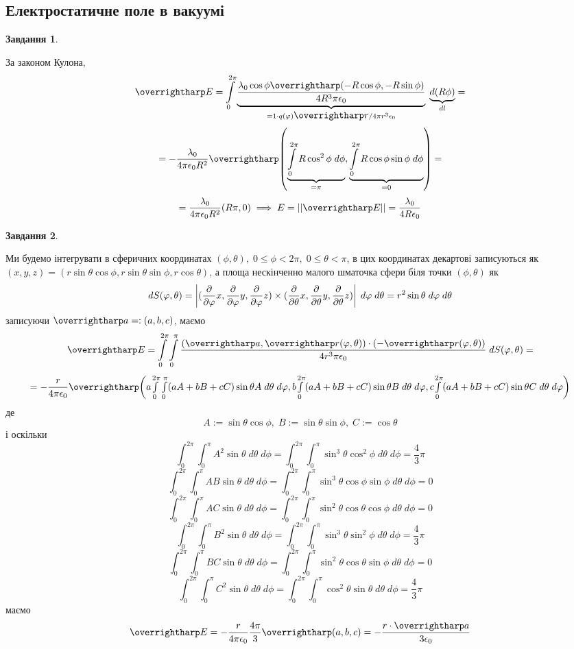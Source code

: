 \documentclass[12pt]{article} %
\newtheorem{prob}{Завдання}
\begin{document}
\subsection{Електростатичне поле в вакуумі}
\setcounter{prob}{0}
\begin{prob}\end{prob}%
	За законом Кулона,
	\[\myvec{E}=\int_0^{2\pi}\underbrace{\frac{\lambda_0\cos\oldphi\myvec{(-R\cos\oldphi,-R\sin\oldphi)}}{4R^3\pi\epsilon_0}}
	_{=1\cdot q(\phi)\myvec{r}/4\pi r^3\epsilon_0}\;\underbrace{d(R\oldphi)}_{dl}=\]
	\[=-\frac{\lambda_0}{4\pi\epsilon_0R^2}\myvec{\mybra{\underbrace{\int_0^{2\pi}R\cos^2\oldphi\;d\oldphi}_{=\pi},
	\underbrace{\int_0^{2\pi}R\cos\oldphi\sin\oldphi\;d\oldphi}_{=0}}}=\]
	\[=\frac{\lambda_0}{4\pi\epsilon_0R^2}(R\pi,0)\implies E=\mynorm{\myvec{E}}=\frac{\lambda_0}{4R\epsilon_0}\]
\begin{prob}\end{prob}%
	Ми будемо інтегрувати в сферичних координатах $(\phi,\theta),\;0\leq\phi<2\pi,\;0\leq\theta<\pi$, в цих координатах декартові записуються
	як $(x,y,z)=(r\sin\theta\cos\phi,r\sin\theta\sin\phi,r\cos\theta)$, а площа нескінченно малого шматочка сфери біля точки $(\phi,\theta)$
	як \[dS(\varphi,\theta)=\left|(\frac{\partial}{\partial\varphi}x,\frac{\partial}{\partial\varphi}y,\frac{\partial}{\partial\varphi}z)\times
	(\frac{\partial}{\partial\theta}x,\frac{\partial}{\partial\theta}y,\frac{\partial}{\partial\theta}z)\right|\;d\varphi\;d\theta=r^2\sin\theta
	\;d\varphi\;d\theta\]записуючи $\myvec{a}=:(a,b,c)$, маємо
	\[\myvec{E}=\int_0^{2\pi}\int_0^\pi\frac{(\myvec{a},\myvec{r}(\phi,\theta))\cdot(-\myvec{r}(\phi,\theta))}
	{4r^3\pi\epsilon_0}\;dS(\phi,\theta)=\]
	\[=-\frac{r}{4\pi\epsilon_0}\myvec{\mybra{
	a{\int_0^{2\pi}\int_0^\pi(aA+bB+cC)\sin\theta A \;d\theta\;d\phi},
	b{\int_0^{2\pi}(aA+bB+cC)\sin\theta B\;d\theta\;d\phi},
	c{\int_0^{2\pi}(aA+bB+cC)\sin\theta C \;d\theta\;d\phi}
	}}\]
	де
	\[A:=\sin\theta\cos\phi,\;B:=\sin\theta\sin\phi,\;C:=\cos\theta\]
	і оскільки
	\newcommand{\myint}[1]{\int_0^{2\pi}\int_0^\pi#1\;d\theta\;d\phi}
	\[\myint{A^2\sin\theta}=\myint{\sin^3\theta\cos^2\phi}=\frac{4}{3}\pi\]
	\[\myint{AB\sin\theta}=\myint{\sin^3\theta\cos\phi\sin\phi}=0\]
	\[\myint{AC\sin\theta}=\myint{\sin^2\theta\cos\theta\cos\phi}=0\]
	\[\myint{B^2\sin\theta}=\myint{\sin^3\theta\sin^2\phi}=\frac{4}{3}\pi\]
	\[\myint{BC\sin\theta}=\myint{\sin^2\theta\cos\theta\sin\phi}=0\]
	\[\myint{C^2\sin\theta}=\myint{\cos^2\theta\sin\theta}=\frac{4}{3}\pi\]
	маємо
	\[\myvec{E}=-\frac{r}{4\pi\epsilon_0}\frac{4\pi}{3}\myvec{\mybra{a,b,c}}=-\frac{r\cdot\myvec{a}}{3\epsilon_0}\]
\end{document}
